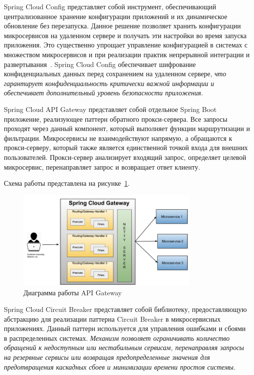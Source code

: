 Spring Cloud Config представляет собой инструмент, обеспечивающий централизованное хранение конфигурации приложений и их динамическое обновление без перезапуска.
Данное решение позволяет хранить конфигурации микросервисов на удаленном сервере и получать эти настройки во время запуска приложения. Это существенно упрощает управление конфигурацией в системах с множеством микросервисов и при реализации практик непрерывной интеграции и развертывания~\cite{13_davis2020}.
Spring Cloud Config обеспечивает шифрование конфиденциальных данных перед сохранением на удаленном сервере, \textit{что гарантирует конфиденциальность критически важной информации и обеспечивает дополнительный уровень безопасности приложения}.

Spring Cloud API Gateway представляет собой отдельное Spring Boot приложение, реализующее паттерн обратного прокси-сервера.
Все запросы проходят через данный компонент, который выполняет функции маршрутизации и фильтрации.
Микросервисы не взаимодействуют напрямую, а обращаются к прокси-серверу, который также является единственной точкой входа для внешних пользователей. Прокси-сервер анализирует входящий запрос, определяет целевой микросервис, перенаправляет запрос и возвращает ответ клиенту.

Схема работы представлена на рисунке~\ref{fig:api_gateway}.

\begin{figure}[htbp]
    \centering
    \includegraphics[width=0.8\textwidth]{Dissertation/images/api_gateway}
    \caption{Диаграмма работы API Gateway}
    \label{fig:api_gateway}
\end{figure}

Spring Cloud Circuit Breaker представляет собой библиотеку, предоставляющую абстракцию для реализации паттерна Circuit Breaker в микросервисных приложениях.
Данный паттерн используется для управления ошибками и сбоями в распределенных системах. \textit{Механизм позволяет ограничивать количество обращений к недоступным или нестабильным сервисам, перенаправляя запросы на резервные сервисы или возвращая предопределенные значения для предотвращения каскадных сбоев и минимизации времени простоя системы}.

